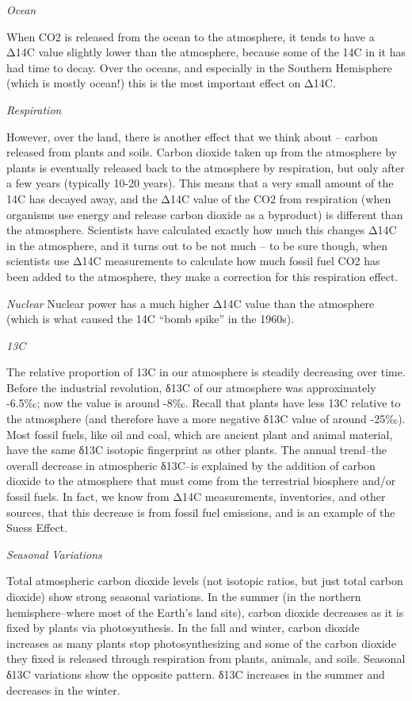 \documentclass[
]{book}
\begin{document}
\emph{Ocean}

When CO2 is released from the ocean to the atmosphere, it tends to have a Δ14C value slightly lower than the atmosphere, because some of the 14C in it has had time to decay. Over the oceans, and especially in the Southern Hemisphere (which is mostly ocean!) this is the most important effect on Δ14C.

\emph{Respiration}

However, over the land, there is another effect that we think about -- carbon released from plants and soils. Carbon dioxide taken up from the atmosphere by plants is eventually released back to the atmosphere by respiration, but only after a few years (typically 10-20 years). This means that a very small amount of the 14C has decayed away, and the Δ14C value of the CO2 from respiration (when organisms use energy and release carbon dioxide as a byproduct) is different than the atmosphere. Scientists have calculated exactly how much this changes Δ14C in the atmosphere, and it turns out to be not much -- to be sure though, when scientists use Δ14C measurements to calculate how much fossil fuel CO2 has been added to the atmosphere, they make a correction for this respiration effect.

\emph{Nuclear}
Nuclear power has a much higher Δ14C value than the atmosphere (which is what caused the 14C ``bomb spike'' in the 1960s).

\emph{13C}

The relative proportion of 13C in our atmosphere is steadily decreasing over time. Before the industrial revolution, δ13C of our atmosphere was approximately -6.5‰; now the value is around -8‰. Recall that plants have less 13C relative to the atmosphere (and therefore have a more negative δ13C value of around -25‰). Most fossil fuels, like oil and coal, which are ancient plant and animal material, have the same δ13C isotopic fingerprint as other plants. The annual trend--the overall decrease in atmospheric δ13C--is explained by the addition of carbon dioxide to the atmosphere that must come from the terrestrial biosphere and/or fossil fuels. In fact, we know from Δ14C measurements, inventories, and other sources, that this decrease is from fossil fuel emissions, and is an example of the Suess Effect.

\emph{Seasonal Variations}

Total atmospheric carbon dioxide levels (not isotopic ratios, but just total carbon dioxide) show strong seasonal variations. In the summer (in the northern hemisphere--where most of the Earth's land sits), carbon dioxide decreases as it is fixed by plants via photosynthesis. In the fall and winter, carbon dioxide increases as many plants stop photosynthesizing and some of the carbon dioxide they fixed is released through respiration from plants, animals, and soils. Seasonal δ13C variations show the opposite pattern. δ13C increases in the summer and decreases in the winter.
\end{document}
